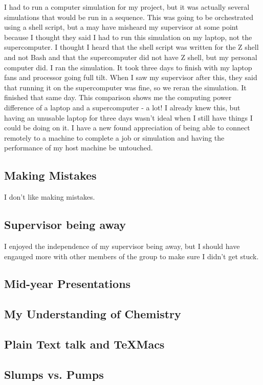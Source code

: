\documentclass[11pt]{article}
\begin{document}
I had to run a computer simulation for my project, but it was actually several simulations that would be run in a sequence. This was going to be orchestrated using a shell script, but a may have misheard my supervisor at some point because I thought they said I had to run this simulation on my laptop, not the supercomputer. I thought I heard that the shell script was written for the Z shell and not Bash and that the supercomputer did not have Z shell, but my personal computer did. I ran the simulation. It took three days to finish with my laptop fans and processor going full tilt. When I saw my supervisor after this, they said that running it on the supercomputer was fine, so we reran the simulation. It finished that same day. This comparison shows me the computing power difference of a laptop and a supercomputer - a lot! I already knew this, but having an unusable laptop for three days wasn't ideal when I still have things I could be doing on it. I have a new found appreciation of being able to connect remotely to a machine to complete a job or simulation and having the performance of my host machine be untouched.

\subsection{Making Mistakes}

I don't like making mistakes.

\subsection{Supervisor being away}

I enjoyed the independence of my supervisor being away, but I should have engauged more with other members of the group to make sure I didn't get stuck.

\subsection{Mid-year Presentations}
\subsection{My Understanding of Chemistry}
\subsection{Plain Text talk and TeXMacs}
\subsection{Slumps vs. Pumps}
\end{document}
